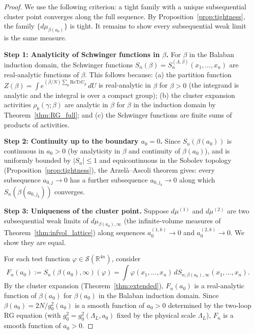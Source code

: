 \documentclass[11pt,a4paper]{amsart}
\theoremstyle{definition}
\newcommand{\R}{\mathbb{R}}
\newcommand{\re}{\mathrm{Re}}
\newcommand{\Tr}{\mathrm{Tr}}
\begin{document}
\begin{proof}
We use the following criterion: a tight family with a unique subsequential cluster
point converges along the full sequence.  By Proposition~\ref{prop:tightness},
the family $\{d\mu_{\beta(a_0)}\}$ is tight.  It remains to show every
subsequential weak limit is the same measure.

\textbf{Step 1: Analyticity of Schwinger functions in $\beta$.}
For $\beta$ in the Balaban induction domain, the Schwinger functions
$S_n(\beta) = S_n^{(\Lambda,\beta)}(x_1,\ldots,x_n)$
are real-analytic functions of $\beta$.  This follows because:
(a) the partition function $Z(\beta) = \int e^{(\beta/N)\sum_p\re\Tr U_p}\,dU$
is real-analytic in $\beta$ for $\beta > 0$ (the integrand is analytic and
the integral is over a compact group); (b) the cluster expansion activities
$\rho_k(\gamma;\beta)$ are analytic in $\beta$ for $\beta$ in the induction domain
by Theorem~\ref{thm:RG_full}; and (c) the Schwinger functions are
finite sums of products of activities.

\textbf{Step 2: Continuity up to the boundary $a_0 = 0$.}
Since $S_n(\beta(a_0))$ is continuous in $a_0 > 0$ (by analyticity in $\beta$ and
continuity of $\beta(a_0)$), and is uniformly bounded by $|S_n|\le 1$ and
equicontinuous in the Sobolev topology (Proposition~\ref{prop:tightness}), the Arzel\`a--Ascoli
theorem gives: every subsequence $a_{0,j}\to 0$ has a further subsequence
$a_{0,j_k}\to 0$ along which $S_n(\beta(a_{0,j_k}))$ converges.

\textbf{Step 3: Uniqueness of the cluster point.}
Suppose $d\mu^{(1)}$ and $d\mu^{(2)}$ are two subsequential weak limits
of $d\mu_{\beta(a_0),\infty}$ (the infinite-volume measures of Theorem~\ref{thm:infvol_lattice})
along sequences $a_0^{(1,k)}\to 0$ and $a_0^{(2,k)}\to 0$.  We show they are equal.

For each test function $\varphi\in\mathcal{S}(\R^{4n})$, consider
\[
  F_n(a_0) := S_n(\beta(a_0),\infty)(\varphi)
  = \int \varphi(x_1,\ldots,x_n)\,dS_{n;\beta(a_0),\infty}(x_1,\ldots,x_n).
\]
By the cluster expansion (Theorem~\ref{thm:extended}), $F_n(a_0)$ is a real-analytic
function of $\beta(a_0)$ for $\beta(a_0)$ in the Balaban induction domain.
Since $\beta(a_0) = 2N/g_0^2(a_0)$ is a smooth function of $a_0 > 0$ determined
by the two-loop RG equation (with $g_0^2 = g_0^2(\Lambda_L,a_0)$ fixed by the
physical scale $\Lambda_L$), $F_n$ is a smooth function of $a_0 > 0$.


\end{proof}
\end{document}
